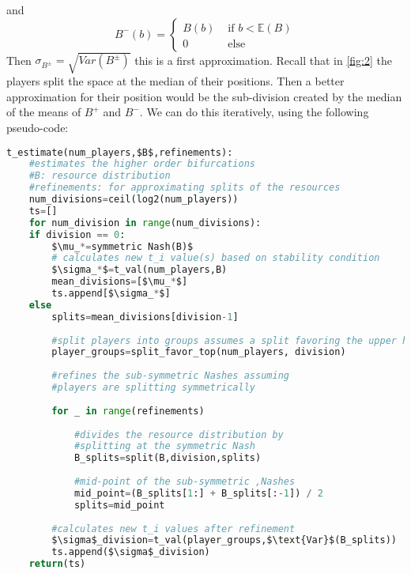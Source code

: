 \documentclass{article}
\begin{document}
                and 
                \begin{equation}
                    B^-(b)=\begin{cases}
                        B(b) & \text{ if } b<\mathbb{E}(B) \\ %
                        0 & \text{ else }
                    \end{cases}
                \end{equation}
                Then $\sigma_{B^\pm}=\sqrt{Var(B^\pm)}$ this is a first approximation. Recall that in \cref{fig:2} the players split the space at the median of their positions. Then a better approximation for their position would be the sub-division created by the median of the means of $B^+$ and $B^-$. We can do this iteratively, using the following pseudo-code:

                               
\begin{lstlisting}[language=Python]
t_estimate(num_players,$B$,refinements):
    #estimates the higher order bifurcations
    #B: resource distribution
    #refinements: for approximating splits of the resources
    num_divisions=ceil(log2(num_players))
    ts=[]
    for num_division in range(num_divisions):
    if division == 0:
        $\mu_*=symmetric Nash(B)$
        # calculates new t_i value(s) based on stability condition
        $\sigma_*$=t_val(num_players,B)
        mean_divisions=[$\mu_*$]
        ts.append[$\sigma_*$]
    else
        splits=mean_divisions[division-1]
        
        #split players into groups assumes a split favoring the upper half
        player_groups=split_favor_top(num_players, division)
        
        #refines the sub-symmetric Nashes assuming 
        #players are splitting symmetrically
        
        for _ in range(refinements)
            
            #divides the resource distribution by
            #splitting at the symmetric Nash 
            B_splits=split(B,division,splits)
            
            #mid-point of the sub-symmetric ,Nashes
            mid_point=(B_splits[1:] + B_splits[:-1]) / 2 
            splits=mid_point
        
        #calculates new t_i values after refinement
        $\sigma$_division=t_val(player_groups,$\text{Var}$(B_splits))
        ts.append($\sigma$_division)        
    return(ts)
\end{lstlisting}
\end{document}
